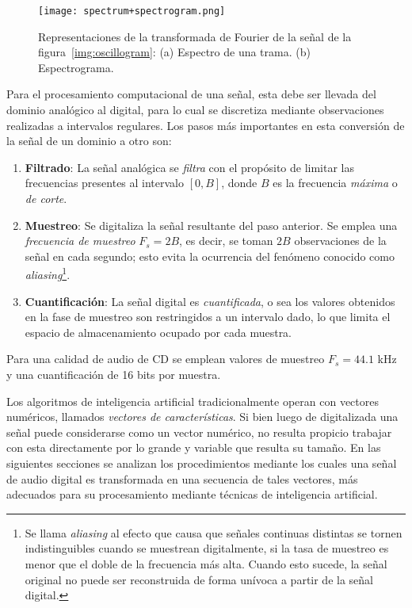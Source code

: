\begin{figure}[!h]
    \centering
    \texttt{[image: spectrum+spectrogram.png]}
    \caption{Representaciones de la transformada de Fourier de la señal de la figura~\ref{img:oscillogram}: (a) Espectro de una trama. (b) Espectrograma.}
    \label{img:spectrum+spectrogram}
\end{figure}

Para el procesamiento computacional de una señal, esta debe ser llevada del dominio analógico al digital, para lo cual se discretiza mediante observaciones realizadas a intervalos regulares.
Los pasos más importantes en esta conversión de la señal de un dominio a otro son:

\begin{enumerate}
    \item \textbf{Filtrado}: La señal analógica se \textit{filtra} con el propósito de limitar las frecuencias presentes al intervalo $[0,B]$, donde $B$ es la frecuencia \textit{máxima} o \textit{de corte}.
    \item \textbf{Muestreo}: Se digitaliza la señal resultante del paso anterior.
    Se emplea una \textit{frecuencia de muestreo} $F_s = 2B$, es decir, se toman $2B$ observaciones de la señal en cada segundo; esto evita la ocurrencia del fenómeno conocido como \textit{aliasing}\footnote{Se llama \textit{aliasing} al efecto que causa que señales continuas distintas se tornen indistinguibles cuando se muestrean digitalmente, si la tasa de muestreo es menor que el doble de la frecuencia más alta.
    Cuando esto sucede, la señal original no puede ser reconstruida de forma unívoca a partir de la señal digital.}.
    \item \textbf{Cuantificación}: La señal digital es \textit{cuantificada}, o sea los valores obtenidos en la fase de muestreo son restringidos a un intervalo dado, lo que limita el espacio de almacenamiento ocupado por cada muestra.
\end{enumerate}

Para una calidad de audio de CD se emplean valores de muestreo $F_s = 44.1$ kHz y una cuantificación de 16 bits por muestra.

Los algoritmos de inteligencia artificial tradicionalmente operan con vectores numéricos, llamados \textit{vectores de características}.
Si bien luego de digitalizada una señal puede considerarse como un vector numérico, no resulta propicio trabajar con esta directamente por lo grande y variable que resulta su tamaño.
En las siguientes secciones se analizan los procedimientos mediante los cuales una señal de audio digital es transformada en una secuencia de tales vectores, más adecuados para su procesamiento mediante técnicas de inteligencia artificial.


